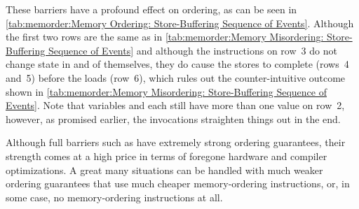 These barriers have a profound effect on ordering, as can be seen in
\cref{tab:memorder:Memory Ordering: Store-Buffering Sequence of Events}.
Although the first two rows are the same as in
\cref{tab:memorder:Memory Misordering: Store-Buffering Sequence of Events}
and although the  instructions on row~3
do not change state
in and of themselves, they do cause the stores to complete
(rows~4 and~5) before the
loads (row~6), which rules out the counter-intuitive outcome shown in
\cref{tab:memorder:Memory Misordering: Store-Buffering Sequence of Events}.
Note that variables  and  each still have more than one
value on row~2, however, as promised earlier, the 
invocations straighten things out in the end.

Although full barriers such as  have extremely strong
ordering guarantees, their strength comes at a high price in terms
of foregone hardware and compiler optimizations.
A great many situations can be handled with much weaker ordering guarantees
that use much cheaper memory-ordering instructions, or, in some case, no
memory-ordering instructions at all.

